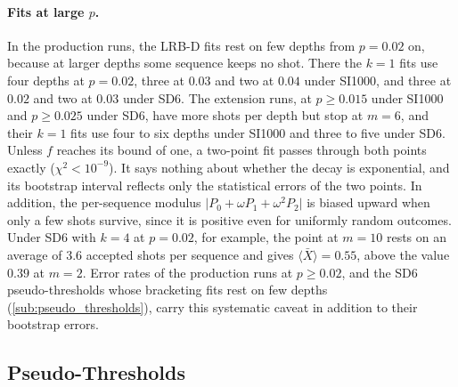 \paragraph{Fits at large $p$.}
In the production runs, the LRB-D fits rest on few depths from $p = 0.02$ on, because at larger depths some sequence keeps no shot. There the $k = 1$ fits use four depths at $p = 0.02$, three at $0.03$ and two at $0.04$ under SI1000, and three at $0.02$ and two at $0.03$ under SD6. The extension runs, at $p \ge 0.015$ under SI1000 and $p \ge 0.025$ under SD6, have more shots per depth but stop at $m = 6$, and their $k = 1$ fits use four to six depths under SI1000 and three to five under SD6. Unless $f$ reaches its bound of one, a two-point fit passes through both points exactly ($\chi^2 < 10^{-9}$). It says nothing about whether the decay is exponential, and its bootstrap interval reflects only the statistical errors of the two points. In addition, the per-sequence modulus $\lvert P_0 + \omega P_1 + \omega^2 P_2 \rvert$ is biased upward when only a few shots survive, since it is positive even for uniformly random outcomes. Under SD6 with $k = 4$ at $p = 0.02$, for example, the point at $m = 10$ rests on an average of 3.6 accepted shots per sequence and gives $\langle \bar{X} \rangle = 0.55$, above the value $0.39$ at $m = 2$. Error rates of the production runs at $p \ge 0.02$, and the SD6 pseudo-thresholds whose bracketing fits rest on few depths (\autoref{sub:pseudo_thresholds}), carry this systematic caveat in addition to their bootstrap errors.

\subsection{Pseudo-Thresholds}
\label{sub:pseudo_thresholds}

